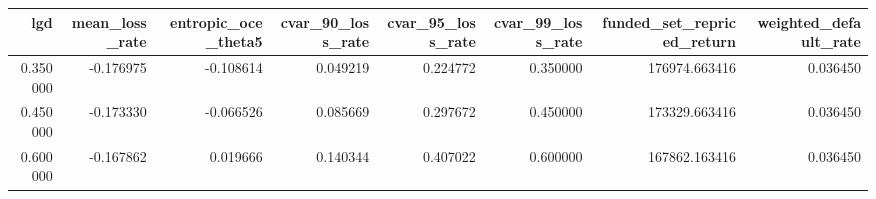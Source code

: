 \begin{tabular}{rrrrrrrr}
\toprule
lgd & mean\_loss\_rate & entropic\_oce\_theta5 & cvar\_90\_loss\_rate & cvar\_95\_loss\_rate & cvar\_99\_loss\_rate & funded\_set\_repriced\_return & weighted\_default\_rate \\
\midrule
0.350000 & -0.176975 & -0.108614 & 0.049219 & 0.224772 & 0.350000 & 176974.663416 & 0.036450 \\
0.450000 & -0.173330 & -0.066526 & 0.085669 & 0.297672 & 0.450000 & 173329.663416 & 0.036450 \\
0.600000 & -0.167862 & 0.019666 & 0.140344 & 0.407022 & 0.600000 & 167862.163416 & 0.036450 \\
\bottomrule
\end{tabular}
